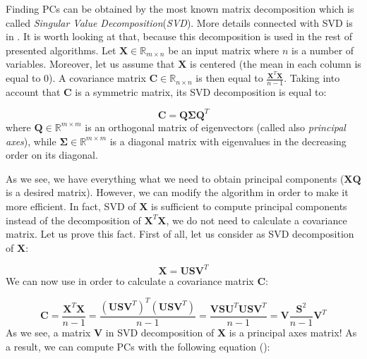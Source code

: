 Finding PCs can be obtained by the most known matrix decomposition which is called \textit{Singular Value Decomposition}(\textit{SVD}). More details connected with SVD is in . It is worth looking at that, because this decomposition is used in the rest of presented algorithms. Let $\boldsymbol{X} \in \mathbb{R}_{m \times n}$ be an input matrix where $n$ is a number of variables. Moreover, let us assume that $\boldsymbol{X}$ is centered (the mean in each column is equal to $0$). A covariance matrix $\boldsymbol{C} \in \mathbb{R}_{n \times n}$ is then equal to $\frac{\boldsymbol{X}^T\boldsymbol{X}}{n-1}$. Taking into account that $\boldsymbol{C}$ is a symmetric matrix, its SVD decomposition is equal to:

\begin{equation}\label{eq:pca1}
    \boldsymbol{C}=\boldsymbol{Q}\boldsymbol{\Sigma}{\boldsymbol{Q}^T}
\end{equation}
where $\boldsymbol{Q} \in \mathbb{R}^{m \times m}$ is an orthogonal matrix of eigenvectors (called also \textit{principal axes}), while $\boldsymbol{\Sigma} \in \mathbb{R}^{m \times m}$ is a diagonal matrix with eigenvalues in the decreasing order on its diagonal. 

As we see, we have everything what we need to obtain principal components ($\boldsymbol{X}\boldsymbol{Q}$ is a desired matrix). However, we can modify the algorithm in order to make it more efficient. In fact, SVD of $\boldsymbol{X}$ is sufficient to compute principal components instead of the decomposition of $\boldsymbol{X}^T\boldsymbol{X}$, we do not need to calculate a covariance matrix. Let us prove this fact. First of all, let us consider as SVD decomposition of $\boldsymbol{X}$:

\begin{equation}\label{eq:pca2}
    \boldsymbol{X}=\boldsymbol{U}\boldsymbol{S}\boldsymbol{V}^{T}
\end{equation}
We can now use  in order to calculate a covariance matrix $\boldsymbol{C}$:

\begin{equation}\label{eq:pca3}
    \boldsymbol{C}=\frac{\boldsymbol{X}^T\boldsymbol{X}}{n-1} = \frac{(\boldsymbol{U}\boldsymbol{S}\boldsymbol{V}^T)^T(\boldsymbol{U}\boldsymbol{S}\boldsymbol{V}^T)}{n-1} = \frac{\boldsymbol{V}\boldsymbol{S}\boldsymbol{U}^T\boldsymbol{U}\boldsymbol{S}\boldsymbol{V}^T}{n-1} = \boldsymbol{V}\frac{\boldsymbol{S}^{2}}{n-1}\boldsymbol{V}^{T} 
\end{equation}
As we see, a matrix $\boldsymbol{V}$ in SVD decomposition of $\boldsymbol{X}$ is a principal axes matrix! As a result, we can compute PCs with the following equation (\cite{Jolliffe}): 

